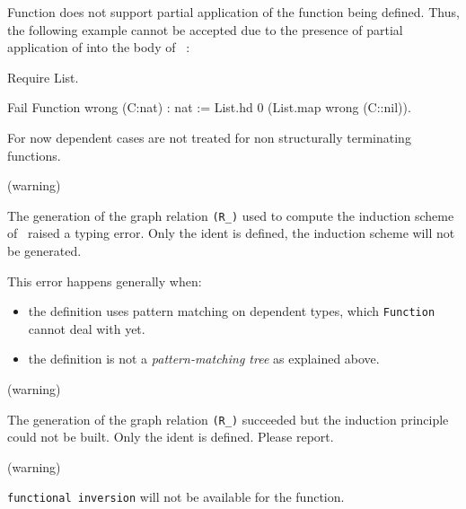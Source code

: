 Function does not support partial application of the function being defined. Thus, the following example cannot be accepted due to the presence of partial application of  into the body of ~:
\begin{coq_eval}
Require List.
\end{coq_eval}
\begin{coq_example*}
Fail Function wrong (C:nat) : nat :=
  List.hd 0 (List.map wrong (C::nil)).
\end{coq_example*}

For now dependent cases are not treated for non structurally terminating functions.



\begin{ErrMsgs}
\item {}
\item {}
\item {}

\item {} (warning)

  The generation of the graph relation \texttt{(R\_\ident)} used to
  compute the induction scheme of \ident\ raised a typing error. Only
  the ident is defined, the induction scheme will not be generated.

  This error happens generally when:

  \begin{itemize}
  \item the definition uses pattern matching on dependent types, which
    \texttt{Function} cannot deal with yet.
  \item the definition is not a \emph{pattern-matching tree} as
    explained above.
  \end{itemize}

\item {} (warning)

  The generation of the graph relation \texttt{(R\_\ident)} succeeded
  but the induction principle could not be built. Only the ident is
  defined. Please report.

\item {} (warning)

  \texttt{functional inversion} will not be available for the
  function.
\end{ErrMsgs}


